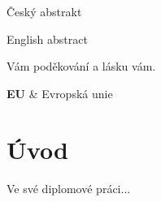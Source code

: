 \message{ !name(thesis.tex)}\documentclass[FM,DP]{tulthesis}
\begin{document}

\begin{abstractCZ}
Český abstrakt
\end{abstractCZ}
\vspace{2cm}
\begin{abstractEN}
English abstract
\end{abstractEN}
\begin{acknowledgement}
Vám poděkování a lásku vám.
\end{acknowledgement}
\tableofcontents
\clearpage
\begin{abbrList}
\textbf{EU} & Evropská unie \\
\end{abbrList}
\chapter{Úvod}
Ve své diplomové práci...
\end{document}
